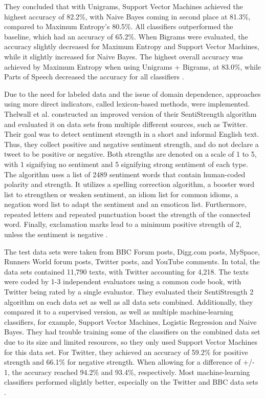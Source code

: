 They concluded that with Unigrams, Support Vector Machines achieved the highest accuracy of 82.2\%, with Naive Bayes coming in second place at 81.3\%, compared to Maximum Entropy's 80.5\%. All classifiers outperformed the baseline, which had an accuracy of 65.2\%. When Bigrams were evaluated, the accuracy slightly decreased for Maximum Entropy and Support Vector Machines, while it slightly increased for Naive Bayes. The highest overall accuracy was achieved by Maximum Entropy when using Unigrams + Bigrams, at 83.0\%, while Parts of Speech decreased the accuracy for all classifiers \cite{GoBHaHua2009}. 

Due to the need for labeled data and the issue of domain dependence, approaches using more direct indicators, called lexicon-based methods, were implemented. Thelwall et al. constructed an improved version of their SentiStrength algorithm and evaluated it on data sets from multiple different sources, such as Twitter. Their goal was to detect sentiment strength in a short and informal English text. Thus, they collect positive and negative sentiment strength, and do not declare a tweet to be positive or negative. Both strengths are denoted on a scale of 1 to 5, with 1 signifying no sentiment and 5 signifying strong sentiment of each type. The algorithm uses a list of 2489 sentiment words that contain human-coded polarity and strength. It utilizes a spelling correction algorithm, a booster word list to strengthen or weaken sentiment, an idiom list for common idioms, a negation word list to adapt the sentiment and an emoticon list. Furthermore, repeated letters and repeated punctuation boost the strength of the connected word. Finally, exclamation marks lead to a minimum positive strength of 2, unless the sentiment is negative \cite{10.1002/asi.21662}.

The test data sets were taken from BBC Forum posts, Digg.com posts, MySpace, Runners World forum posts, Twitter posts, and YouTube comments. In total, the data sets contained 11,790 texts, with Twitter accounting for 4,218. The texts were coded by 1-3 independent evaluators using a common code book, with Twitter being rated by a single evaluator. They evaluated their SentiStrength 2 algorithm on each data set as well as all data sets combined. Additionally, they compared it to a supervised version, as well as multiple machine-learning classifiers, for example, Support Vector Machines, Logistic Regression and Naive Bayes. They had trouble training some of the classifiers on the combined data set due to its size and limited resources, so they only used Support Vector Machines for this data set. For Twitter, they achieved an accuracy of 59.2\% for positive strength and 66.1\% for negative strength. When allowing for a difference of +/- 1, the accuracy reached 94.2\% and 93.4\%, respectively. Most machine-learning classifiers performed slightly better, especially on the Twitter and BBC data sets \cite{10.1002/asi.21662}.

